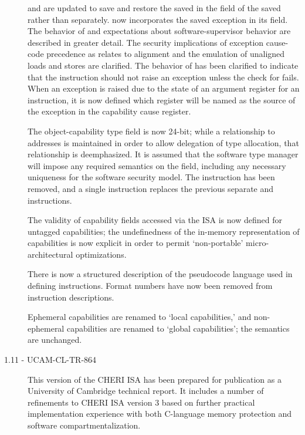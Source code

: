 \begin{description}
   and  are updated to save and
  restore the saved \PC{} in the
  \coffset{} field of the saved \EPCC{} rather than separately.
  \EPCC{} now incorporates the saved exception \PC{} in its \coffset{} field.
  The behavior of \EPCC{} and expectations about software-supervisor behavior
  are described in greater detail.
  The security implications of exception cause-code precedence as relates to
  alignment and the emulation of unaligned loads and stores are clarified.
  The behavior of  has been clarified to indicate
  that the instruction should not raise an exception unless the check for
   fails.
  When an exception is raised due to the state of an argument register for
  an instruction, it is now defined which register will be named as the source
  of the exception in the capability cause register.

  The object-capability type field is now 24-bit; while a relationship to
  addresses is maintained in order to allow delegation of type allocation,
  that relationship is deemphasized.
  It is assumed that the software type manager will impose any required
  semantics on the field, including any necessary uniqueness for the software
  security model.
  The  instruction has been removed, and a single
   instruction
  replaces the previous separate  and
   instructions.

  The validity of capability fields accessed via the ISA is now defined for
  untagged capabilities; the undefinedness of the in-memory representation of
  capabilities is now explicit in order to permit `non-portable'
  micro-architectural optimizations.

  There is now a structured description of the pseudocode language used in
  defining instructions.
  Format numbers have now been removed from instruction descriptions.

  Ephemeral capabilities are renamed to `local capabilities,' and
  non-ephemeral capabilities are renamed to `global capabilities'; the
  semantics are unchanged.

\item[1.11 - UCAM-CL-TR-864]
  This version of the CHERI ISA has been prepared for publication as a
  University of Cambridge technical report.
  It includes a number of refinements to CHERI ISA version 3 based on further
  practical implementation experience with both C-language memory protection
  and software compartmentalization.


\end{description}
